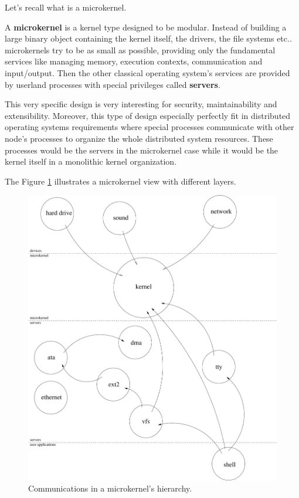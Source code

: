 Let's recall what is a microkernel.

A \textbf{microkernel} is a kernel type designed to be modular. Instead
of building a large binary object containing the kernel itself, the drivers,
the file systems etc.. microkernels try to be as small as possible,
providing only the fundamental services like managing memory, execution
contexts, communication and input/output. Then the other classical operating
system's services are provided by userland processes with special privileges
called \textbf{servers}.

This very specific design is very interesting for security, maintainability
and extensibility. Moreover, this type of design especially perfectly fit
in distributed operating systems requirements where special processes
communicate with other node's processes to organize the whole distributed
system resources. These processes would be the servers in the microkernel
case while it would be the kernel itself in a monolithic kernel organization.

The Figure \ref{figure:overview_microkernel} illustrates a microkernel
view with different layers.

\begin{figure}[h]
  \begin{center}
    \includegraphics[scale=0.5]{figures/overview_microkernel.pdf}
    \caption{Communications in a microkernel's hierarchy.}
    \label{figure:overview_microkernel}
  \end{center}
\end{figure}


